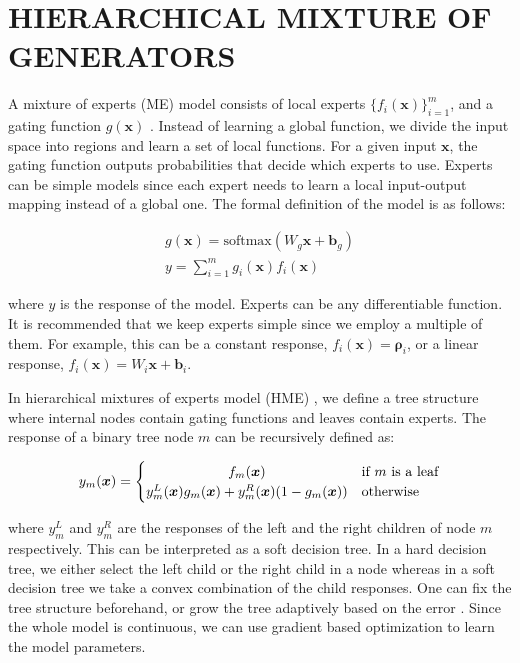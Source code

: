 \documentclass[a4paper,onesided,12pt]{report}
\begin{document}
%
%
%
\chapter{HIERARCHICAL MIXTURE OF GENERATORS}
\label{chapter:hme}

A mixture of experts (ME) model consists of local experts $\{f_i(\boldsymbol{x})\}_{i=1}^{m}$, and a gating function $g(\boldsymbol{x})$ \cite{me}. Instead of learning a global function, we divide the input space into regions and learn a set of local functions. For a given input $\boldsymbol{x}$, the gating function outputs probabilities that decide which experts to use. Experts can be simple models since each expert needs to learn a local input-output mapping instead of a global one. The formal definition of the model is as follows:

\begin{eqnarray}
g(\boldsymbol{x}) = \text{softmax}(W_g \boldsymbol{x} + \boldsymbol{b}_g)\\
y = \sum_{i=1}^m g_i(\boldsymbol{x}) f_i(\boldsymbol{x})
\end{eqnarray}

where $y$ is the response of the model. Experts can be any differentiable function. It is recommended that we keep experts simple since we employ a multiple of them. For example, this can be a constant response, $f_i(\boldsymbol{x})=\boldsymbol{\rho}_i$, or a linear response, $f_i(\boldsymbol{x})=W_i \boldsymbol{x} + \boldsymbol{b}_i$.

In hierarchical mixtures of experts model (HME) \cite{hme}, we define a tree structure where internal nodes contain gating functions and leaves contain experts. The response of a binary tree node $m$ can be recursively defined as:

\begin{equation}
y_m(\boldsymbol{x})=
	\begin{cases}
		\hfil f_m(\boldsymbol{x}) &\text{if $m$ is a leaf} \\
		\hfil y_m^{L}(\boldsymbol{x})g_m(\boldsymbol{x}) + y_m^{R}(\boldsymbol{x})(1 - g_m(\boldsymbol{x})) &\text{otherwise}
	\end{cases}
\end{equation}

where $y_m^L$ and $y_m^R$ are the responses of the left and the right children of node $m$ respectively. This can be interpreted as a soft decision tree. In a hard decision tree, we either select the left child or the right child in a node whereas in a soft decision tree we take a convex combination of the child responses. One can fix the tree structure beforehand, or grow the tree adaptively based on the error \cite{sdt, budding}. Since the whole model is continuous, we can use gradient based optimization to learn the model parameters.
\end{document}
